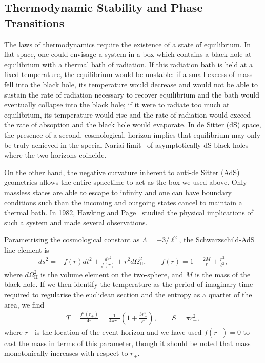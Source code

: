 \documentclass[
twoside,
openright,
frontopenright,
]{dmathesis}
\begin{document}
\subsection{Thermodynamic Stability and Phase Transitions}
\label{sec:hawkingpage}

The laws of thermodynamics require the existence of a state of equilibrium. In
flat space, one could envisage a system in a box which contains a black hole at
equilibrium with a thermal bath of radiation. If this radiation bath is held at
a fixed temperature, the equilibrium would be unstable: if a small excess of
mass fell into the black hole, its temperature would decrease and would not be
able to sustain the rate of radiation necessary to recover equilibrium and the
bath would eventually collapse into the black hole; if it were to radiate too
much at equilibrium, its temperature would rise and the rate of radiation would
exceed the rate of absoption and the black hole would evaporate. In de Sitter
(dS) space, the presence of a second, cosmological, horizon implies that
equilibrium may only be truly achieved in the special Nariai
limit~\cite{Nariai:1950aa,Nariai:1951aa} of asymptotically dS black holes where
the two horizons coincide.

On the other hand, the negative curvature inherent to anti-de Sitter (AdS)
geometries allows the entire spacetime to act as the box we used above. Only
massless states are able to escape to infinity and one can have boundary
conditions such than the incoming and outgoing states cancel to maintain a
thermal bath. In 1982, Hawking and Page~\cite{Hawking:1982dh} studied the
physical implications of such a system and made several observations.

Parametrising the cosmological constant as $\Lambda = -3/\ell^2$, the
Schwarzschild-AdS line element is
\begin{gather}
  ds^2 = -f(r)dt^2 + \frac{dr^2}{f(r)} + r^2 d\Omega_{\mathrm{II}}^2, \qquad
  f(r) = 1-\frac{2M}{r}+\frac{r^2}{\ell^2},
  \label{eq:schwAdS}
\end{gather}
where $d\Omega_\mathrm{II}^2$ is the volume element on the two-sphere, and $M$
is the mass of the black hole. If we then identify the temperature as the period
of imaginary time required to regularise the euclidean section and the entropy
as a quarter of the area, we find
\begin{align}
  T = \frac{f'(r_+)}{4\pi} = \frac{1}{4\pi
    r_+}\left(1+\frac{3r_+^2}{\ell^2}\right), \qquad S = \pi r_+^2,
\end{align}
where $r_+$ is the location of the event horizon and we have used $f(r_+)=0$ to
cast the mass in terms of this parameter, though it should be noted that mass
monotonically increases with respect to $r_+$.
\end{document}

